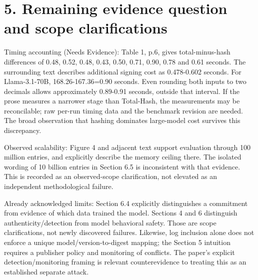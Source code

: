 \documentclass[10pt]{article}
\begin{document}
\section*{5. Remaining evidence question and scope clarifications}
Timing accounting (Needs Evidence): Table 1, p.6, gives total-minus-hash differences of 0.48, 0.52, 0.48, 0.43, 0.50, 0.71, 0.90, 0.78 and 0.61 seconds. The surrounding text describes additional signing cost as 0.478-0.602 seconds. For Llama-3.1-70B, 168.26-167.36=0.90 seconds. Even rounding both inputs to two decimals allows approximately 0.89-0.91 seconds, outside that interval. If the prose measures a narrower stage than Total-Hash, the measurements may be reconcilable; raw per-run timing data and the benchmark revision are needed. The broad observation that hashing dominates large-model cost survives this discrepancy.\par
Observed scalability: Figure 4 and adjacent text support evaluation through 100 million entries, and explicitly describe the memory ceiling there. The isolated wording of 10 billion entries in Section 6.5 is inconsistent with that evidence. This is recorded as an observed-scope clarification, not elevated as an independent methodological failure.\par
Already acknowledged limits: Section 6.4 explicitly distinguishes a commitment from evidence of which data trained the model. Sections 4 and 6 distinguish authenticity/detection from model behavioral safety. Those are scope clarifications, not newly discovered failures. Likewise, log inclusion alone does not enforce a unique model/version-to-digest mapping; the Section 5 intuition requires a publisher policy and monitoring of conflicts. The paper’s explicit detection/monitoring framing is relevant counterevidence to treating this as an established separate attack.\par
\end{document}
